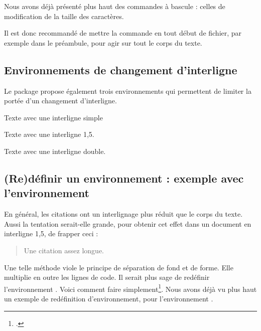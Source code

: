 Nous avons déjà présenté plus haut des commandes à bascule : celles de modification de la taille des caractères.

Il est donc recommandé de mettre la commande  en tout début de fichier, par exemple dans le préambule, pour agir sur tout le corps du texte.

\subsection{Environnements de changement d'interligne}

Le package  propose également trois environnements qui permettent de limiter la portée d'un changement d'interligne. 

\begin{latexcode}
\begin{singlespace}
Texte avec une interligne simple
\end{singlespace}
\begin{onehalfspace}
Texte avec une interligne 1,5.
\end{onehalfspace}
\begin{doublespace}
Texte avec une interligne double.
\end{doublespace}
\end{latexcode}

\subsection[Rédéfinir un environnement : quotation]{(Re)définir un environnement : exemple avec l'environnement }

En général, les citations ont un interlignage plus réduit que le corps du texte. Aussi la tentation serait-elle grande, pour obtenir cet effet dans un document en interligne 1,5, de frapper ceci :

\begin{latexcode}
\begin{singlespace}
\begin{quotation}
Une citation assez longue.
\end{quotation}
\end{singlespace}
\end{latexcode}

Une telle méthode viole le principe de séparation de fond et de forme. Elle multiplie en outre les lignes de code. Il serait plus sage de redéfinir l'environnement . Voici comment faire simplement\footcite[Nous nous somme basés sur la classe  :][]{bredele}. Nous avons déjà vu plus haut un exemple de redéfinition d'environnement, pour l'environnement . 

